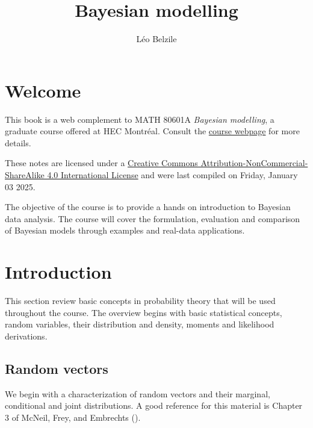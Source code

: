\documentclass[
  11pt,
  letterpaper,
]{scrbook}
\title{Bayesian modelling}
\author{Léo Belzile}
\date{}
\renewcommand*\contentsname{Table of contents}
\newcommand\contentsname{Table of contents}
\theoremstyle{definition}
\theoremstyle{plain}
\theoremstyle{plain}
\theoremstyle{definition}
\theoremstyle{definition}
\theoremstyle{remark}
\begin{document}
\frontmatter
\maketitle

\renewcommand*\contentsname{Table of contents}
{
\setcounter{tocdepth}{2}
\tableofcontents
}

\mainmatter
{}

\chapter*{Welcome}\label{welcome}


This book is a web complement to MATH 80601A \emph{Bayesian modelling},
a graduate course offered at HEC Montréal. Consult the
\href{https://lbelzile.github.io/bayesmod}{course webpage} for more
details.

These notes are licensed under a
\href{http://creativecommons.org/licenses/by-nc-sa/4.0/}{Creative
Commons Attribution-NonCommercial-ShareAlike 4.0 International License}
and were last compiled on Friday, January 03 2025.

The objective of the course is to provide a hands on introduction to
Bayesian data analysis. The course will cover the formulation,
evaluation and comparison of Bayesian models through examples and
real-data applications.


\chapter{Introduction}\label{introduction}

This section review basic concepts in probability theory that will be
used throughout the course. The overview begins with basic statistical
concepts, random variables, their distribution and density, moments and
likelihood derivations.

\section{Random vectors}\label{random-vectors}

We begin with a characterization of random vectors and their marginal,
conditional and joint distributions. A good reference for this material
is Chapter 3 of McNeil, Frey, and Embrechts
().
\end{document}
